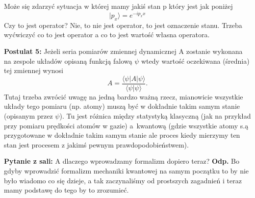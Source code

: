Może się zdarzyć sytuacja w której mamy jakiś stan p który jest jak poniżej
\begin{equation*}
	|p_x \rangle = e^{-ip_x x}
\end{equation*}
Czy to jest operator? Nie, to nie jest operator, to jest oznaczenie stanu.
Trzeba wyćwiczyć co to jest operator a co to jest wartość własna operatora.

\iffalse $ napisane wyżej
\textbf{Definicja:} Operator Hermitowski A to jest taki operator który dla którego zachodzi
\begin{equation*}
	\left< x | (A\psi) \right> = \langle (Ax) \vert \psi \rangle
\end{equation*}
\begin{equation*}
	\left< x | (A\psi) \right> \equiv \langle x | A \vert \psi \rangle
\end{equation*}
Korzystając z powyższych możemy zapisać
\fi

\iffalse to powinno być znane, jest też wspomniane wyżej.
Jeśli $\psi_n$ są funkcjami własnymi operatora $A$ o wartościach własnych $a_n$, to
\begin{align*}
	&\left.
	\begin{aligned}
		\left< \psi_n | A | \psi_n \right> &= a_n \left< \psi_n | \psi_n \right> \\
		(A \psi_n)^* = a_n^* \psi_n^* &= \langle (A \psi_n) | \psi_n \rangle = a_n^* \left< \psi_n | \psi_n \right>
	\end{aligned}
	\right\}
	\Rightarrow a_n = a_n^*, \quad a_n \in \Re
\end{align*}
\fi

\textbf{Postulat 5:} Jeżeli seria pomiarów zmiennej dynamicznej A zostanie wykonana na zespole układów opisaną funkcją falową $\psi$ wtedy wartość oczekiwana (średnia) tej zmiennej wynosi
\begin{equation*}
	A = \frac{\langle \psi | A | \psi \rangle}{\langle\psi | \psi\rangle}.
\end{equation*}
Tutaj trzeba zwrócić uwagę na jedną bardzo ważną rzecz, mianowicie wszystkie układy tego pomiaru (np. atomy) muszą być w dokładnie takim samym stanie
(opisanym przez $\psi$). Tu jest różnica między statystyką klasyczną
(jak na przykład przy pomiaru prędkości atomów w gazie) a~kwantową
(gdzie wszystkie atomy s.ą przygotowane w dokładnie takim samym
stanie ale proces kiedy mierzymy ten stan jest procesem z jakimś pewnym prawdopodobieństwem).

\textbf{Pytanie z sali:} A dlaczego wprowadzamy formalizm dopiero teraz? \textbf{Odp.} Bo gdyby wprowadzić formalizm mechaniki kwantowej na samym początku to by nie było wiadomo co się dzieje, a tak zaczynaliśmy od prostszych zagadnień i teraz mamy podstawę do tego by to zrozumieć.

